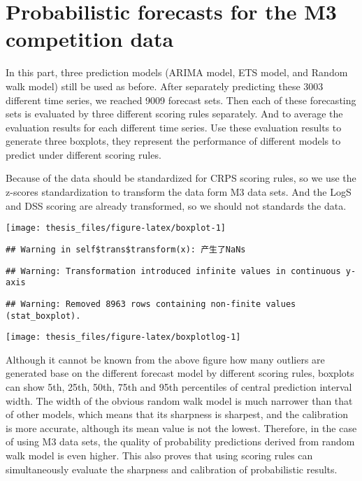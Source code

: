 \documentclass{monashthesis}
\theoremstyle{definition}
\theoremstyle{definition}
\theoremstyle{definition}
\theoremstyle{remark}
\begin{document}
\section{Probabilistic forecasts for the M3 competition
data}\label{probabilistic-forecasts-for-the-m3-competition-data}

In this part, three prediction models (ARIMA model, ETS model, and
Random walk model) still be used as before. After separately predicting
these 3003 different time series, we reached 9009 forecast sets. Then
each of these forecasting sets is evaluated by three different scoring
rules separately. And to average the evaluation results for each
different time series. Use these evaluation results to generate three
boxplots, they represent the performance of different models to predict
under different scoring rules.

Because of the data should be standardized for CRPS scoring rules, so we
use the z-scores standardization to transform the data form M3 data
sets. And the LogS and DSS scoring are already transformed, so we should
not standards the data.

\texttt{[image: thesis\_files/figure-latex/boxplot-1]}

\begin{verbatim}
## Warning in self$trans$transform(x): 产生了NaNs
\end{verbatim}

\begin{verbatim}
## Warning: Transformation introduced infinite values in continuous y-axis
\end{verbatim}

\begin{verbatim}
## Warning: Removed 8963 rows containing non-finite values (stat_boxplot).
\end{verbatim}

\texttt{[image: thesis\_files/figure-latex/boxplotlog-1]}

Although it cannot be known from the above figure how many outliers are
generated base on the different forecast model by different scoring
rules, boxplots can show 5th, 25th, 50th, 75th and 95th percentiles of
central prediction interval width. The width of the obvious random walk
model is much narrower than that of other models, which means that its
sharpness is sharpest, and the calibration is more accurate, although
its mean value is not the lowest. Therefore, in the case of using M3
data sets, the quality of probability predictions derived from random
walk model is even higher. This also proves that using scoring rules can
simultaneously evaluate the sharpness and calibration of probabilistic
results.
\end{document}
